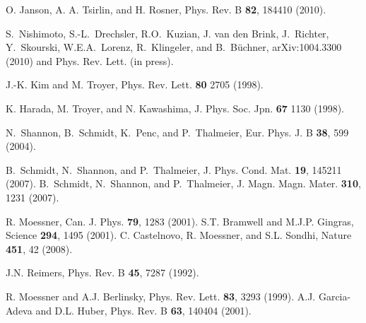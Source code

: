 \documentclass[aps,twocolumn,groupedaddress]{revtex4}
\begin{document}
\begin{thebibliography}{10}
 O. Janson, A. A. Tsirlin, and H. Rosner,
Phys. Rev. B {\bf 82}, 184410 (2010).

 S.~Nishimoto, S.-L.~Drechsler, R.O.\ Kuzian,  J. van den Brink,
      J.~Richter, Y.~Skourski, W.E.A.~Lorenz,
      R.~Klingeler, and B.~B\"uchner,
       arXiv:1004.3300 (2010) and Phys. Rev. Lett. (in press).



 J.-K. Kim and M. Troyer,
Phys. Rev. Lett. {\bf 80} 2705 (1998).

 K. Harada, M. Troyer, and N. Kawashima,
J. Phys. Soc. Jpn. {\bf 67} 1130 (1998).

 N.~Shannon, B.~Schmidt, K.~Penc, and P.~Thalmeier, Eur. Phys. J. B \textbf{38}, 599
(2004).


 B.~Schmidt, N.~Shannon, and P.~Thalmeier, J. Phys. Cond. Mat. \textbf{19}, 145211
(2007).
 B.~Schmidt, N.~Shannon, and P.~Thalmeier, J. Magn. Magn. Mater. \textbf{310}, 1231
(2007).

 R. Moessner,
Can. J. Phys. {\bf 79}, 1283 (2001).
 S.T. Bramwell and M.J.P. Gingras,
Science {\bf 294}, 1495 (2001).
C. Castelnovo, R. Moessner, and S.L. Sondhi,
Nature {\bf 451}, 42 (2008).

J.N. Reimers, Phys. Rev. B {\bf 45}, 7287 (1992).

 R. Moessner and A.J. Berlinsky,
Phys. Rev. Lett. {\bf 83}, 3293 (1999).
 A.J. Garcia-Adeva and D.L. Huber, Phys. Rev. B {\bf 63}, 140404
(2001).



\end{thebibliography}
\end{document}
